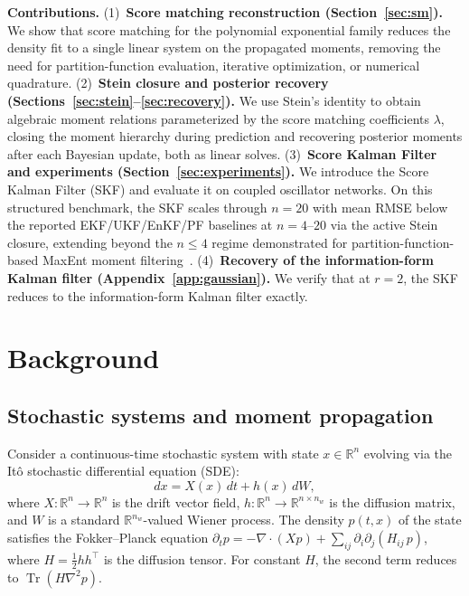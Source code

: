 \documentclass{article}
\newcommand{\R}{\mathbb{R}}
\newcommand{\Tr}{\operatorname{Tr}}
\theoremstyle{definition}
\begin{document}
\textbf{Contributions.}
(1)~\textbf{Score matching reconstruction (Section~\ref{sec:sm}).}
We show that score matching for the polynomial exponential family
reduces the density fit to a single linear system on the propagated
moments, removing the need for partition-function evaluation, iterative
optimization, or numerical quadrature.
(2)~\textbf{Stein closure and posterior recovery
(Sections~\ref{sec:stein}--\ref{sec:recovery}).}
We use Stein's identity to obtain algebraic moment relations
parameterized by the score matching coefficients $\lambda$, closing the
moment hierarchy during prediction and recovering posterior moments
after each Bayesian update, both as linear solves.
(3)~\textbf{Score Kalman Filter and experiments
(Section~\ref{sec:experiments}).}
We introduce the Score Kalman Filter (SKF) and evaluate it on coupled
oscillator networks. On this structured benchmark, the SKF scales through $n{=}20$ with mean RMSE
below the reported EKF/UKF/EnKF/PF baselines at $n{=}4$--$20$
via the active Stein closure,
extending beyond the
$n \le 4$ regime demonstrated for partition-function-based MaxEnt
moment filtering~\cite{teng2025}.
(4)~\textbf{Recovery of the information-form Kalman filter
(Appendix~\ref{app:gaussian}).} We verify that at $r{=}2$, the SKF
reduces to the information-form Kalman filter exactly.

\section{Background}
\label{sec:background}

\subsection{Stochastic systems and moment propagation}

Consider a continuous-time stochastic system with state $x \in \R^n$
evolving via the It\^o stochastic differential equation (SDE):
\begin{equation}\label{eq:sde}
    dx = X(x)\,dt + h(x)\,dW,
\end{equation}
where $X : \R^n \to \R^n$ is the drift vector field,
$h : \R^n \to \R^{n \times n_w}$ is the diffusion matrix,
and $W$ is a standard $\R^{n_w}$-valued Wiener process.
The density $p(t,x)$ of the state satisfies the Fokker--Planck equation
$\partial_t p = -\nabla \cdot (Xp) + \sum_{ij}\partial_i\partial_j(H_{ij}\, p)$,
where $H = \frac{1}{2}hh^\top$ is the diffusion tensor.
For constant $H$, the second term reduces to $\Tr(H\nabla^2 p)$.
\end{document}
